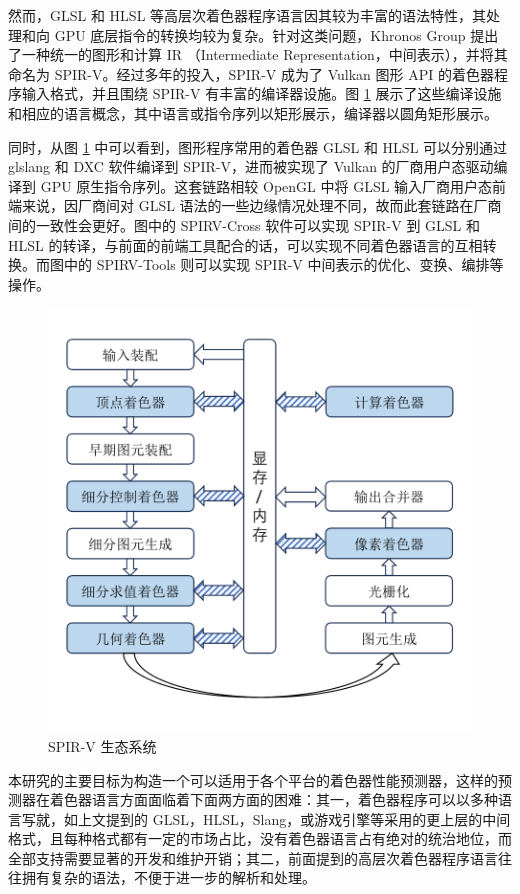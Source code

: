 然而，GLSL 和 HLSL 等高层次着色器程序语言因其较为丰富的语法特性，其处理和向 GPU 底层指令的转换均较为复杂。针对这类问题，Khronos Group 提出了一种统一的图形和计算 IR （Intermediate Representation，中间表示），并将其命名为 SPIR-V。经过多年的投入，SPIR-V 成为了 Vulkan 图形 API 的着色器程序输入格式，并且围绕 SPIR-V 有丰富的编译器设施。图 \ref{fig:spirv_ecosystem} 展示了这些编译设施和相应的语言概念，其中语言或指令序列以矩形展示，编译器以圆角矩形展示。

同时，从图 \ref{fig:spirv_ecosystem} 中可以看到，图形程序常用的着色器 GLSL 和 HLSL 可以分别通过 glslang 和 DXC 软件编译到 SPIR-V，进而被实现了 Vulkan 的厂商用户态驱动编译到 GPU 原生指令序列。这套链路相较 OpenGL 中将 GLSL 输入厂商用户态前端来说，因厂商间对 GLSL 语法的一些边缘情况处理不同，故而此套链路在厂商间的一致性会更好。图中的 SPIRV-Cross 软件可以实现 SPIR-V 到 GLSL 和 HLSL 的转译，与前面的前端工具配合的话，可以实现不同着色器语言的互相转换。而图中的 SPIRV-Tools 则可以实现 SPIR-V 中间表示的优化、变换、编排等操作。

\begin{figure}
    \centering
    \includegraphics[page=3, width=0.6\linewidth, trim=50 50 50 50, clip]{figures/pictures.pdf}
    \caption{SPIR-V 生态系统}
    \label{fig:spirv_ecosystem}
\end{figure}

本研究的主要目标为构造一个可以适用于各个平台的着色器性能预测器，这样的预测器在着色器语言方面面临着下面两方面的困难：其一，着色器程序可以以多种语言写就，如上文提到的 GLSL，HLSL，Slang，或游戏引擎等采用的更上层的中间格式，且每种格式都有一定的市场占比，没有着色器语言占有绝对的统治地位，而全部支持需要显著的开发和维护开销；其二，前面提到的高层次着色器程序语言往往拥有复杂的语法，不便于进一步的解析和处理。

